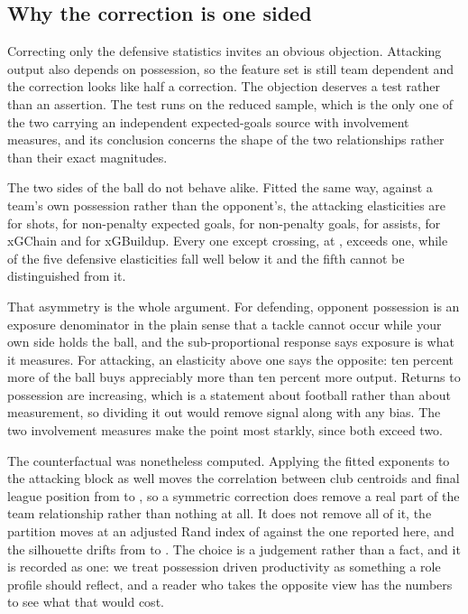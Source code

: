 

\subsection{Why the correction is one sided}
\label{sec:si:symmetric}

Correcting only the defensive statistics invites an obvious objection. Attacking output also
depends on possession, so the feature set is still team dependent and the correction looks like
half a correction. The objection deserves a test rather than an assertion. The test runs on the
reduced sample, which is the only one of the two carrying an independent expected-goals source
with involvement measures, and its conclusion concerns the shape of the two relationships rather
than their exact magnitudes.

The two sides of the ball do not behave alike. Fitted the same way, against a team's own
possession rather than the opponent's, the attacking elasticities are \BetaShots{} for shots,
\BetaNPXG{} for non-penalty expected goals, \BetaGoals{} for non-penalty goals, \BetaAssists{}
for assists, \BetaXGChain{} for xGChain and \BetaXGBuildup{} for xGBuildup. Every one except
crossing, at \BetaCrosses{}, exceeds one, while \NElastExcludeOne{} of the five defensive
elasticities fall
well below it and the fifth cannot be distinguished from it.

That asymmetry is the whole argument. For defending, opponent possession is an exposure
denominator in the plain sense that a tackle cannot occur while your own side holds the ball,
and the sub-proportional response says exposure is what it measures. For attacking, an
elasticity above one says the opposite: ten percent more of the ball buys appreciably more than
ten percent more output. Returns to possession are increasing, which is a statement about
football rather than about measurement, so dividing it out would remove signal along with any
bias. The two involvement measures make the point most starkly, since both exceed two.

The counterfactual was nonetheless computed. Applying the fitted exponents to the attacking
block as well moves the correlation between club centroids and final league position from
\SymCorrBaseline{} to \SymCorrAdjusted{}, so a symmetric correction does remove a real part of
the team relationship rather than nothing at all. It does not remove all of it, the partition
moves at an adjusted Rand index of \SymARI{} against the one reported here, and the silhouette
drifts from \SymSilhouetteBase{} to \SymSilhouetteAdj{}. The choice is a judgement rather than a
fact, and it is recorded as one: we treat possession driven productivity as something a role
profile should reflect, and a reader who takes the opposite view has the numbers to see what
that would cost.

